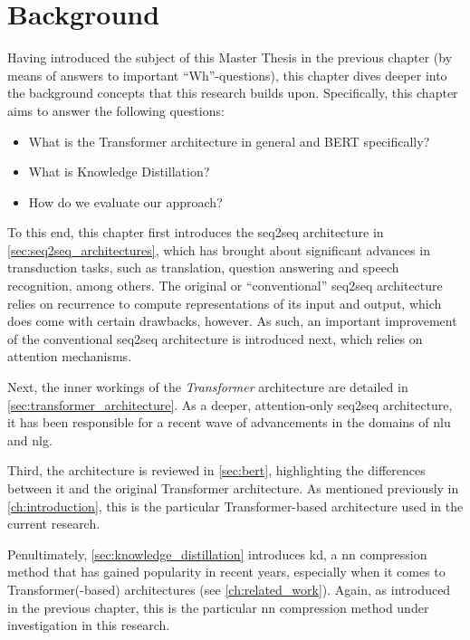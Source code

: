 \chapter{Background}
\label{ch:background}
\glsresetall
Having introduced the subject of this Master Thesis in the previous chapter (by means of answers to important ``Wh''-questions), this chapter dives deeper into the background concepts that this research builds upon. Specifically, this chapter aims to answer the following questions:
\begin{fullwidth}
    \begin{itemize}
        \item What is the Transformer architecture in general and BERT specifically?
        \item What is Knowledge Distillation?
        \item How do we evaluate our approach?
    \end{itemize}
\end{fullwidth}
    
To this end, this chapter first introduces the \gls{seq2seq} architecture in \cref{sec:seq2seq_architectures}, which has brought about significant advances in transduction tasks, such as translation, question answering and speech recognition, among others. The original or ``conventional'' \gls{seq2seq} architecture relies on recurrence to compute representations of its input and output, which does come with certain drawbacks, however. As such, an important improvement of the conventional \gls{seq2seq} architecture is introduced next, which relies on attention mechanisms.

Next, the inner workings of the \emph{Transformer} architecture are detailed in \cref{sec:transformer_architecture}. As a deeper, attention-only \gls{seq2seq} architecture, it has been responsible for a recent wave of advancements in the domains of \gls{nlu} and \gls{nlg}. 

Third, the \bertbase architecture is reviewed in \cref{sec:bert}, highlighting the differences between it and the original Transformer architecture. As mentioned previously in \cref{ch:introduction}, this is the particular Transformer-based architecture used in the current research. 

Penultimately, \cref{sec:knowledge_distillation} introduces \gls{kd}, a \gls{nn} compression method that has gained popularity in recent years, especially when it comes to Transformer(-based) architectures (see \cref{ch:related_work}). Again, as introduced in the previous chapter, this is the particular \gls{nn} compression method under investigation in this research.

